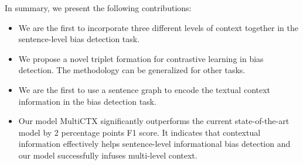 In summary, we present the following contributions:

\begin{itemize}
  \item We are the first to incorporate three different levels of context together in the sentence-level bias detection task. 
  \item We propose a novel triplet formation for contrastive learning in bias detection. The methodology can be generalized for other tasks.
  \item We are the first to use a sentence graph to encode the textual context information in the bias detection task.
  \item Our model MultiCTX significantly outperforms the current state-of-the-art model by 2 percentage points F1 score. It indicates that contextual information effectively helps sentence-level informational bias detection and our model successfully infuses multi-level context.
\end{itemize}